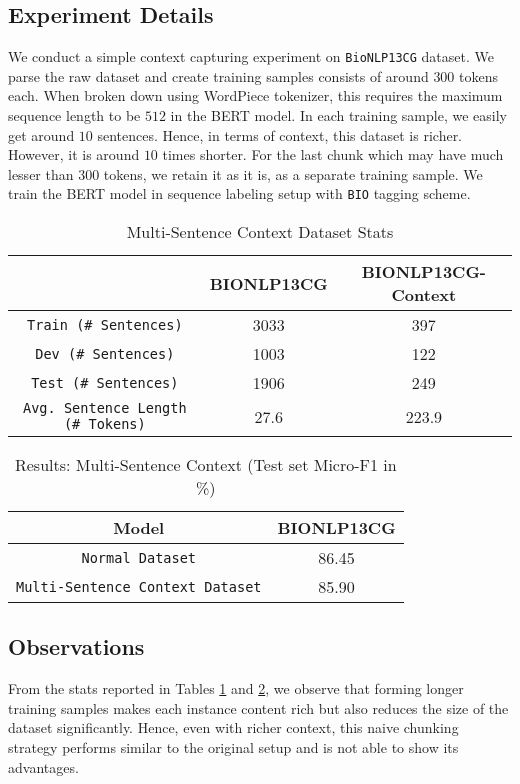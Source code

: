\subsection{Experiment Details}
We conduct a simple context capturing experiment on \texttt{BioNLP13CG} dataset. We parse the raw dataset and create training samples consists of around $300$ tokens each. When broken down using WordPiece tokenizer, this requires the maximum sequence length to be $512$ in the BERT model. In each training sample, we easily get around $10$ sentences. Hence, in terms of context, this dataset is richer. However, it is around $10$ times shorter. For the last chunk which may have much lesser than $300$ tokens, we retain it as it is, as a separate training sample. We train the BERT model in sequence labeling setup with \texttt{BIO} tagging scheme.

\begin{table}[h!]
\centering
\begin{tabular}{|c|c|c|}\hline
	\textbf{} & \textbf{BIONLP13CG} & \textbf{BIONLP13CG-Context}\\\hline
	\texttt{Train (\# Sentences)} & 3033 & 397\\\hline
	\texttt{Dev (\# Sentences)} & 1003 & 122\\\hline
	\texttt{Test (\# Sentences)} & 1906 & 249\\\hline
	\texttt{Avg. Sentence Length (\# Tokens)} & 27.6 & 223.9\\\hline
	\end{tabular}
    \caption{Multi-Sentence Context Dataset Stats}
    \label{tab:context_bio_dataset}
\end{table}

\begin{table}[h!]
\centering
\begin{tabular}{|c|c|}\hline
	\textbf{Model} & \textbf{BIONLP13CG}\\\hline
	\texttt{Normal Dataset} & 86.45\\\hline
	\texttt{Multi-Sentence Context Dataset} & 85.90\\\hline
	\end{tabular}
    \caption{Results: Multi-Sentence Context (Test set Micro-F1 in \%)}
    \label{tab:res_context_bio}
\end{table}

\subsection{Observations}
From the stats reported in Tables \ref{tab:context_bio_dataset} and \ref{tab:res_context_bio}, we observe that forming longer training samples makes each instance content rich but also reduces the size of the dataset significantly. Hence, even with richer context, this naive chunking strategy performs similar to the original setup and is not able to show its advantages. 

